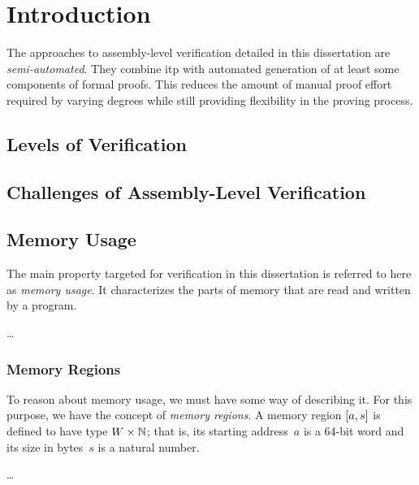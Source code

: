 \chapter{Introduction}

The approaches to assembly-level verification detailed in this dissertation%
are \emph{semi-automated}.
They combine \ac{itp} with automated generation
of at least some components of formal proofs.
This reduces the amount of manual proof effort required by varying degrees
while still providing flexibility in the proving process.


\section{Levels of Verification}  
\section{Challenges of Assembly-Level Verification}

\section{Memory Usage}\label{memory_usage}
The main property targeted for verification in this dissertation
is referred to here as \emph{memory usage}.%
It characterizes the parts of memory that are read and written by a program.


\todo\dots



\subsection{Memory Regions}\label{memory_regions}
To reason about memory usage, we must have some way of describing it.
For this purpose, we have the concept of \emph{memory regions}.%
A memory region $[a,s]$ is defined to have type $W\times\mathbb{N}$;%
%
that is, its starting address~$a$ is a 64-bit word
and its size in bytes~$s$ is a natural number.


\todo\dots



